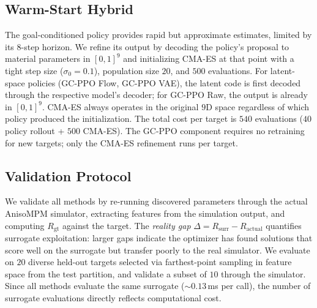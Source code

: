 \subsection{Warm-Start Hybrid}
\label{sec:warmstart}

The goal-conditioned policy provides rapid but approximate estimates, limited by its $8$-step horizon. We refine its output by decoding the policy's proposal to material parameters in $[0,1]^9$ and initializing CMA-ES at that point with a tight step size ($\sigma_0{=}0.1$), population size $20$, and $500$ evaluations. For latent-space policies (GC-PPO Flow, GC-PPO VAE), the latent code is first decoded through the respective model's decoder; for GC-PPO Raw, the output is already in $[0,1]^9$. CMA-ES always operates in the original $9$D space regardless of which policy produced the initialization. The total cost per target is $540$ evaluations ($40$ policy rollout + $500$ CMA-ES). The GC-PPO component requires no retraining for new targets; only the CMA-ES refinement runs per target.

\subsection{Validation Protocol}
\label{sec:validation}

We validate all methods by re-running discovered parameters through the actual AnisoMPM simulator, extracting features from the simulation output, and computing $R_{\text{gt}}$ against the target. The \emph{reality gap} $\Delta = R_{\text{surr}} - R_{\text{actual}}$ quantifies surrogate exploitation: larger gaps indicate the optimizer has found solutions that score well on the surrogate but transfer poorly to the real simulator. We evaluate on $20$ diverse held-out targets selected via farthest-point sampling in feature space from the test partition, and validate a subset of $10$ through the simulator. Since all methods evaluate the same surrogate (${\sim}0.13$\,ms per call), the number of surrogate evaluations directly reflects computational cost.

